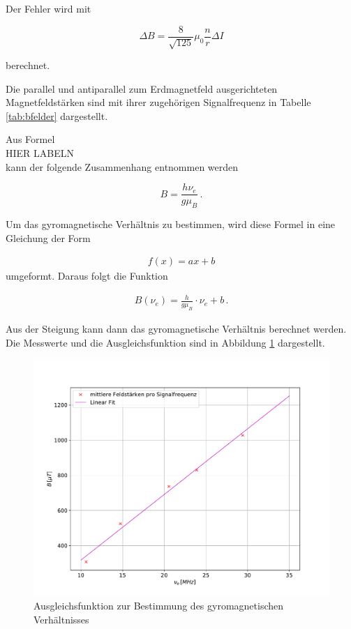 Der Fehler wird mit

\begin{equation}
  \Delta{B} = \frac{8}{\sqrt{125}} \mu_0 \frac{n}{r} \Delta{I}
\end{equation}

berechnet.

Die parallel und antiparallel zum Erdmagnetfeld ausgerichteten Magnetfeldstärken
sind mit ihrer zugehörigen Signalfrequenz in Tabelle \ref{tab:bfelder} dargestellt.



Aus Formel \\
HIER LABELN \\
kann der folgende Zusammenhang entnommen werden

\begin{equation}
  B = \frac{h \nu_e}{g \mu_B} \, .
\end{equation}

Um das gyromagnetische Verhältnis zu bestimmen, wird diese Formel in eine
Gleichung der Form

\begin{align*}
  f(x) = ax + b
\end{align*}
umgeformt. Daraus folgt die Funktion

\begin{align*}
  B(\nu_e) = \frac{h}{g \mu_B} \cdot \nu_e + b \, .
\end{align*}

Aus der Steigung kann dann das gyromagnetische Verhältnis berechnet werden.
Die Messwerte und die Ausgleichsfunktion sind in Abbildung \ref{fig:plot}
dargestellt.

\begin{figure}[H]
  \centering
  \includegraphics[width=\textwidth]{plot.pdf}
  \caption{Ausgleichsfunktion zur Bestimmung des gyromagnetischen Verhältnisses}
  \label{fig:plot}
\end{figure}

